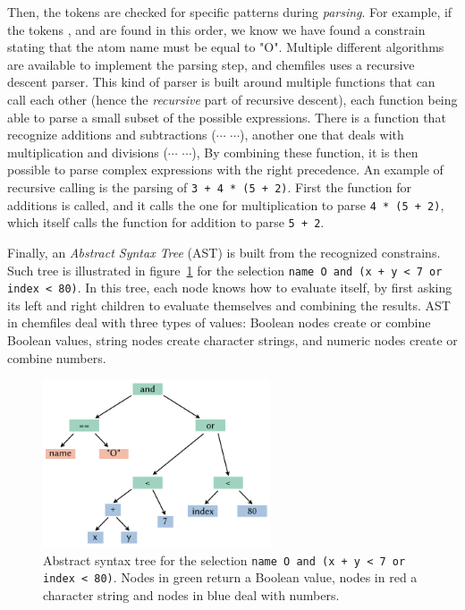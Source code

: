 \documentclass[thesis]{subfiles}
\begin{document}
Then, the tokens are checked for specific patterns during \emph{parsing}. For
example, if the tokens , \token{==} and  are found in
this order, we know we have found a constrain stating that the atom name must be
equal to "O". Multiple different algorithms are available to implement the
parsing step, and chemfiles uses a recursive descent parser. This kind of parser
is built around multiple functions that can call each other (hence the
\emph{recursive} part of recursive descent), each function being able to parse a
small subset of the possible expressions. There is a function that recognize
additions and subtractions ($\cdots$ \token{+|-} $\cdots$), another one that
deals with multiplication and divisions ($\cdots$ \token{*|/} $\cdots$), \etc By
combining these function, it is then possible to parse complex expressions with
the right precedence. An example of recursive calling is the parsing of
\texttt{3 + 4 * (5 + 2)}. First the function for additions is called, and it
calls the one for multiplication to parse \texttt{4 * (5 + 2)}, which itself
calls the function for addition to parse \texttt{5 + 2}.

Finally, an \emph{Abstract Syntax Tree} (AST) is built from the recognized
constrains. Such tree is illustrated in figure~\ref{fig:chemfiles:selection-ast}
for the selection \texttt{name O and (x + y < 7 or index < 80)}. In this tree,
each node knows how to evaluate itself, by first asking its left and right
children to evaluate themselves and combining the results. AST in chemfiles deal
with three types of values: Boolean nodes create or combine Boolean values,
string nodes create character strings, and numeric nodes create or combine
numbers.

\begin{figure}[ht]
    \centering
    \includegraphics[width=0.6\textwidth]{figures/images/chemfiles-selection-ast}
    \caption{Abstract syntax tree for the selection \texttt{name O and (x + y <
    7 or index < 80)}. Nodes in green return a Boolean value, nodes in red a
    character string and nodes in blue deal with numbers.}
    \label{fig:chemfiles:selection-ast}
\end{figure}
\end{document}

